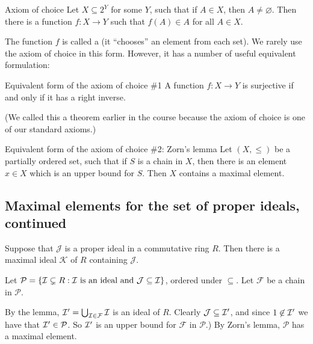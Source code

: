 \documentclass[12pt,letterpaper]{report}
\begin{document}
\begin{axiom}{Axiom of choice}{}
  Let $X \subseteq 2^Y$ for some $Y$, such that if $A \in X$, then $A \neq \varnothing$.
  Then there is a function $f \colon X \to Y$ such that $f(A) \in A$ for all $A \in X$.
\end{axiom}

The function $f$ is called a  (it ``chooses'' an element from each set).
We rarely use the axiom of choice in this form.
However, it has a number of useful equivalent formulation:

\begin{axiom}{Equivalent form of the axiom of choice \#1}{}
  A function $f \colon X \to Y$ is surjective if and only if it has a right inverse.
\end{axiom}

(We called this a theorem earlier in the course because the axiom of choice is one of our standard
axioms.)

\begin{axiom}{Equivalent form of the axiom of choice \#2: Zorn's lemma}{}
  Let $(X, \leq)$ be a partially ordered set, such that if $S$ is a chain in $X$, then there is an
  element $x \in X$ which is an upper bound for $S$.
  Then $X$ contains a maximal element.
\end{axiom}

\pagebreak
\subsection{Maximal elements for the set of proper ideals, continued}

\begin{prop}{}{}
  Suppose that $\mathcal{J}$ is a proper ideal in a commutative ring $R$.
  Then there is a maximal ideal $\mathcal{K}$ of $R$ containing $\mathcal{J}$.
\end{prop}

\begin{thmproof}
  Let $\mathcal{P} = \{\mathcal{I} \subsetneq R : \mathcal{I} \text{ is an ideal and }
    \mathcal{J} \subseteq \mathcal{I}\}$, ordered under $\subseteq$.
  Let $\mathcal{F}$ be a chain in $\mathcal{P}$.

  By the lemma, $\mathcal{I}' = \bigcup_{\mathcal{I} \in \mathcal{F}} \mathcal{I}$ is an ideal of $R$.
  Clearly $\mathcal{J} \subseteq \mathcal{I}'$, and since $1 \not\in \mathcal{I}'$ we have that
  $\mathcal{I}' \in \mathcal{P}$.
  So $\mathcal{I}'$ is an upper bound for $\mathcal{F}$ in $\mathcal{P}$.)
  By Zorn's lemma, $\mathcal{P}$ has a maximal element.
\end{thmproof}
\end{document}
